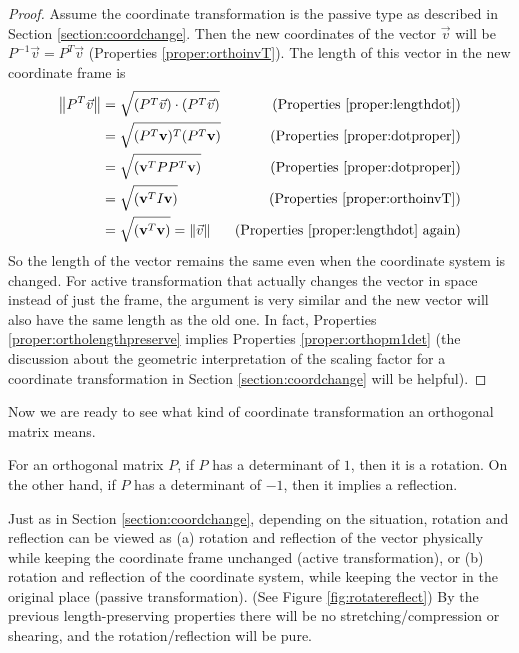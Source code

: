 \begin{proof}
Assume the coordinate transformation is the passive type as described in Section \ref{section:coordchange}. Then the new coordinates of the vector $\vec{v}$ will be $P^{-1}\vec{v} = P^T\vec{v}$ (Properties \ref{proper:orthoinvT}). The length of this vector in the new coordinate frame is
\begin{align*}
\norm{P^T\vec{v}} &= \sqrt{(P^T\vec{v})\cdot(P^T\vec{v})} & \text{(Properties \ref{proper:lengthdot})} \\
&= \sqrt{(P^T\textbf{v})^T(P^T\textbf{v})} & \text{(Properties \ref{proper:dotproper})}\\
&= \sqrt{(\textbf{v}^T PP^T \textbf{v})} & \text{(Properties \ref{proper:dotproper})} \\
&= \sqrt{(\textbf{v}^T I \textbf{v})} & \text{(Properties \ref{proper:orthoinvT})} \\
&= \sqrt{(\textbf{v}^T\textbf{v})} = \norm{\vec{v}} & \text{(Properties \ref{proper:lengthdot} again)}
\end{align*}
So the length of the vector remains the same even when the coordinate system is changed. For active transformation that actually changes the vector in space instead of just the frame, the argument is very similar and the new vector will also have the same length as the old one. In fact, Properties \ref{proper:ortholengthpreserve} implies Properties \ref{proper:orthopm1det} (the discussion about the geometric interpretation of the scaling factor for a coordinate transformation in Section \ref{section:coordchange} will be helpful).
\end{proof}

Now we are ready to see what kind of coordinate transformation an orthogonal matrix means.
\begin{thm}
\label{thm:orthodet}
For an orthogonal matrix $P$, if $P$ has a determinant of $1$, then it is a rotation. On the other hand, if $P$ has a determinant of $-1$, then it implies a reflection.
\end{thm}
Just as in Section \ref{section:coordchange}, depending on the situation, rotation and reflection can be viewed as (a) rotation and reflection of the vector physically while keeping the coordinate frame unchanged (active transformation), or (b) rotation and reflection of the coordinate system, while keeping the vector in the original place (passive transformation). (See Figure \ref{fig:rotatereflect}) By the previous length-preserving properties there will be no stretching/compression or shearing, and the rotation/reflection will be pure.

